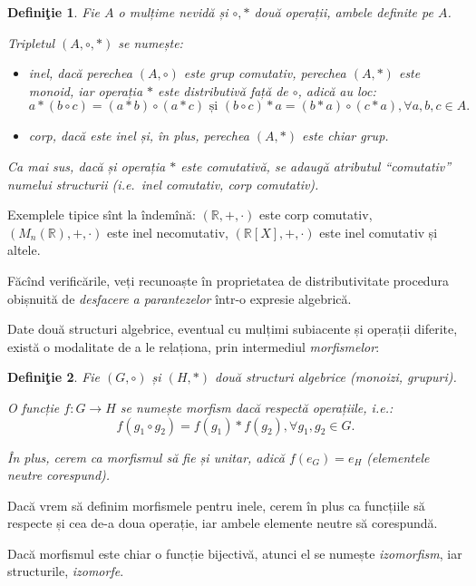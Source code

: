 \documentclass[11pt,a4paper]{article}
\newcommand\qq{\enquote}
\newcommand\RR{\mathbb{R}}
\theoremstyle{dotless}
\theoremstyle{dotlessdr}
\newtheorem{definition}{Defini\c{t}ie}[section]
\begin{document}
\begin{definition}\label{def:inel-corp}
  Fie $A$ o mulțime nevidă și $\circ, \ast$ două operații, ambele definite pe $A$.

  Tripletul $(A, \circ, \ast)$ se numește:
  \begin{itemize}
    \item \emph{inel}, dacă perechea $(A, \circ)$ este grup comutativ, perechea $(A, \ast)$
      este monoid, iar operația $\ast$ este \emph{distributivă} față de $\circ$, adică au loc:
      \[
        a \ast (b \circ c) = (a \ast b) \circ (a \ast c) \text{ și } %
        (b \circ c) \ast a = (b \ast a) \circ (c \ast a), \forall a, b, c \in A.
      \]
    \item \emph{corp}, dacă este inel și, în plus, perechea $(A, \ast)$ este chiar grup.
  \end{itemize}

  Ca mai sus, dacă și operația $\ast$ este comutativă, se adaugă atributul \qq{comutativ}
  numelui structurii (i.e.\ inel comutativ, corp comutativ).
\end{definition}

Exemplele tipice sînt la îndemînă: $(\RR, +, \cdot)$ este corp comutativ,
$(M_n(\RR), +, \cdot)$ este inel necomutativ, $(\RR[X], +, \cdot)$ este inel
comutativ și altele.

Făcînd verificările, veți recunoaște în proprietatea de distributivitate
procedura obișnuită de \emph{desfacere a parantezelor} într-o expresie algebrică.

Date două structuri algebrice, eventual cu mulțimi subiacente și operații diferite,
există o modalitate de a le relaționa, prin intermediul \emph{morfismelor}:

\begin{definition}\label{def:morfism}
  Fie $(G, \circ)$ și $(H, \ast)$ două structuri algebrice (monoizi, grupuri).

  O funcție $f: G \to H$ se numește \emph{morfism} dacă respectă operațiile, i.e.:
  \[
    f(g_1 \circ g_2) = f(g_1) \ast f(g_2), \forall g_1, g_2 \in G.
  \]

  În plus, cerem ca morfismul să fie și \emph{unitar}, adică $f(e_G) = e_H$
  (elementele neutre corespund).
\end{definition}

Dacă vrem să definim morfismele pentru inele, cerem în plus ca funcțiile să
respecte și cea de-a doua operație, iar ambele elemente neutre să corespundă.

Dacă morfismul este chiar o funcție bijectivă, atunci el se numește \emph{izomorfism},
iar structurile, \emph{izomorfe}.
\end{document}
